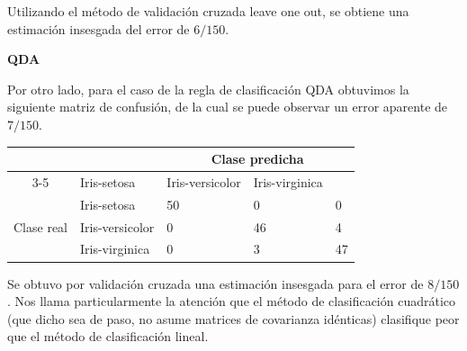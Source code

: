 Utilizando el método de validación cruzada leave one out, se obtiene una estimación insesgada del error de $6/150$.

\textbf{QDA}

Por otro lado, para el caso de la regla de clasificación QDA obtuvimos la siguiente matriz de confusión, de la cual se puede observar un error aparente de $7/150$.
\begin{center}
    \begin{tabular}{|c|l|l|l|l|}
    \hline
    \multicolumn{2}{|l|}{\multirow{2}{*}{}}       & \multicolumn{3}{c|}{Clase predicha}            \\ \cline{3-5} 
    \multicolumn{2}{|l|}{}                        & Iris-setosa & Iris-versicolor & Iris-virginica \\ \hline
    \multirow{3}{*}{Clase real} & Iris-setosa     & 50          & 0               & 0              \\ \cline{2-5} 
                                & Iris-versicolor & 0           & 46              & 4              \\ \cline{2-5} 
                                & Iris-virginica  & 0           & 3               & 47             \\ \hline
    \end{tabular}
\end{center}

Se obtuvo por validación cruzada una estimación insesgada para el error de $8/150$. Nos llama particularmente la atención que el método de clasificación cuadrático (que dicho sea de paso, no asume matrices de covarianza idénticas) clasifique peor que el método de clasificación lineal.

